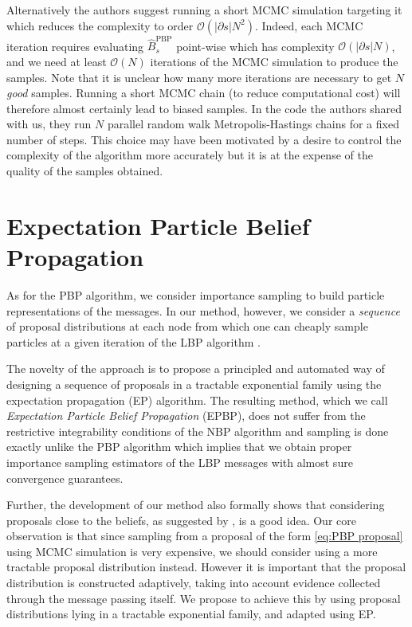 Alternatively the authors suggest running a short MCMC simulation targeting it which reduces the complexity to order $\mathcal O {(|\partial {s}|N^{2})}$. Indeed, each MCMC iteration requires evaluating $\widehat B_{s}^{\text{PBP}}$ point-wise which has complexity $\mathcal O {(|\partial{s}|N)}$, and we need at least $\mathcal{O}(N)$ iterations of the MCMC simulation to produce the samples. Note that it is unclear how many more iterations are necessary to get $N$ \emph{good} samples. Running a short MCMC chain (to reduce computational cost) will therefore almost certainly lead to biased samples. In the code the authors shared with us, they run $N$ parallel random walk Metropolis-Hastings chains \citep[chapter 6]{robert04} for a fixed number of steps. This choice may have been motivated by a desire to control the complexity of the algorithm more accurately but it is at the expense of the quality of the samples obtained.

\section{\label{sec:EPBP}Expectation Particle Belief Propagation}
As for the PBP algorithm, we consider importance sampling to build particle representations of the messages. In our method, however, we consider a \emph{sequence} of proposal distributions at each node from which one can cheaply sample particles at a given iteration of the LBP algorithm \citep{lienart15}.

The novelty of the approach is to propose a principled and automated way of designing a sequence of proposals in a tractable exponential family using the expectation propagation (EP) algorithm. The resulting method, which we call \emph{Expectation Particle Belief Propagation} (EPBP), does not suffer from the restrictive integrability conditions of the NBP algorithm and sampling is done exactly unlike the PBP algorithm which implies that we obtain proper importance sampling estimators of the LBP messages with almost sure convergence guarantees. 

Further, the development of our method also formally shows that considering proposals close to the beliefs, as suggested by \cite{ihler09}, is a good idea.  Our core observation is that since sampling from a proposal of the form \eqref{eq:PBP proposal} using MCMC simulation is very expensive, we should consider using a more tractable proposal distribution instead. However it is important that the proposal distribution is constructed adaptively, taking into account evidence collected through the message passing itself. We propose to achieve this by using proposal distributions lying in a tractable exponential family, and adapted using EP.

